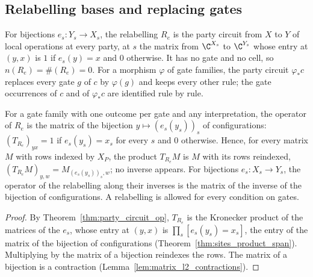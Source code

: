 \subsection{Relabelling bases and replacing gates}
\label{sec:party_syntax_relabel}

\begin{definition}
    \label{def:party_relabel}
    \leanok
    For bijections $e_s\colon Y_s\to X_s$, the relabelling $R_e$ is the party circuit
    from $X$ to $Y$ of local operations at every party, at $s$ the matrix from
    $\C^{X_s}$ to $\C^{Y_s}$ whose entry at $(y,x)$ is $1$ if $e_s(y)=x$ and $0$
    otherwise. It has no gate and no cell, so $n(R_e)=\#(R_e)=0$. For a morphism
    $\varphi$ of gate families, the party circuit $\varphi_*c$ replaces every gate $g$
    of $c$ by $\varphi(g)$ and keeps every other rule; the gate occurrences of $c$ and
    of $\varphi_*c$ are identified rule by rule.
\end{definition}

\begin{theorem}
    \label{thm:party_relabel_op}
    \leanok
    For a gate family with one outcome per gate and any interpretation, the operator
    of $R_e$ is the matrix of the bijection $y\mapsto(e_s(y_s))_s$ of configurations:
    $(T_{R_e})_{yx}=1$ if $e_s(y_s)=x_s$ for every $s$ and $0$ otherwise. Hence, for
    every matrix $M$ with rows indexed by $X_P$, the product $T_{R_e}M$ is $M$ with its
    rows reindexed, $(T_{R_e}M)_{y,w}=M_{(e_s(y_s))_s,w}$; no inverse appears. For
    bijections $e_s\colon X_s\to Y_s$, the operator of the relabelling along their
    inverses is the matrix of the inverse of the bijection of configurations. A
    relabelling is allowed for every condition on gates.
\end{theorem}
\begin{proof}\leanok
    By Theorem~\ref{thm:party_circuit_op}, $T_{R_e}$ is the Kronecker product of the
    matrices of the $e_s$, whose entry at $(y,x)$ is $\prod_s[e_s(y_s)=x_s]$, the
    entry of the matrix of the bijection of configurations
    (Theorem~\ref{thm:sites_product_span}). Multiplying by the matrix of a bijection
    reindexes the rows. The matrix of a bijection is a contraction
    (Lemma~\ref{lem:matrix_l2_contractions}).
\end{proof}

